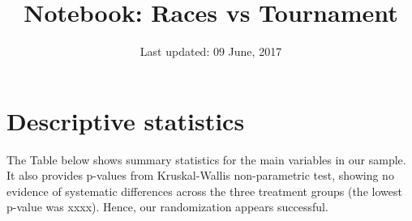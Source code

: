 \documentclass[]{article}
\title{Notebook: Races vs Tournament}
\date{Last updated: 09 June, 2017}
\begin{document}
\maketitle


\tableofcontents
\newpage

\section{Descriptive statistics}\label{descriptive-statistics}

The Table below shows summary statistics for the main variables in our
sample. It also provides p-values from Kruskal-Wallis non-parametric
test, showing no evidence of systematic differences across the three
treatment groups (the lowest p-value was xxxx). Hence, our randomization
appears successful.
\end{document}
